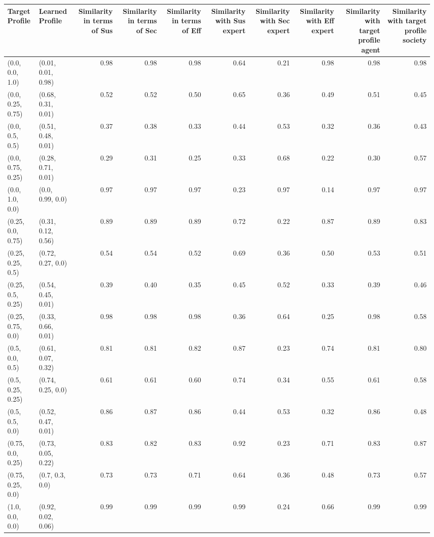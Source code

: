 \begin{tabular}{llrrrrrrrr}
\toprule
Target Profile & Learned Profile & Similarity in terms of Sus & Similarity in terms of Sec & Similarity in terms of Eff & Similarity with Sus expert & Similarity with Sec expert & Similarity with Eff expert & Similarity with target profile agent & Similarity with target profile society \\
\midrule
(0.0, 0.0, 1.0) & (0.01, 0.01, 0.98) & 0.98 & 0.98 & 0.98 & 0.64 & 0.21 & 0.98 & 0.98 & 0.98 \\
(0.0, 0.25, 0.75) & (0.68, 0.31, 0.01) & 0.52 & 0.52 & 0.50 & 0.65 & 0.36 & 0.49 & 0.51 & 0.45 \\
(0.0, 0.5, 0.5) & (0.51, 0.48, 0.01) & 0.37 & 0.38 & 0.33 & 0.44 & 0.53 & 0.32 & 0.36 & 0.43 \\
(0.0, 0.75, 0.25) & (0.28, 0.71, 0.01) & 0.29 & 0.31 & 0.25 & 0.33 & 0.68 & 0.22 & 0.30 & 0.57 \\
(0.0, 1.0, 0.0) & (0.0, 0.99, 0.0) & 0.97 & 0.97 & 0.97 & 0.23 & 0.97 & 0.14 & 0.97 & 0.97 \\
(0.25, 0.0, 0.75) & (0.31, 0.12, 0.56) & 0.89 & 0.89 & 0.89 & 0.72 & 0.22 & 0.87 & 0.89 & 0.83 \\
(0.25, 0.25, 0.5) & (0.72, 0.27, 0.0) & 0.54 & 0.54 & 0.52 & 0.69 & 0.36 & 0.50 & 0.53 & 0.51 \\
(0.25, 0.5, 0.25) & (0.54, 0.45, 0.01) & 0.39 & 0.40 & 0.35 & 0.45 & 0.52 & 0.33 & 0.39 & 0.46 \\
(0.25, 0.75, 0.0) & (0.33, 0.66, 0.01) & 0.98 & 0.98 & 0.98 & 0.36 & 0.64 & 0.25 & 0.98 & 0.58 \\
(0.5, 0.0, 0.5) & (0.61, 0.07, 0.32) & 0.81 & 0.81 & 0.82 & 0.87 & 0.23 & 0.74 & 0.81 & 0.80 \\
(0.5, 0.25, 0.25) & (0.74, 0.25, 0.0) & 0.61 & 0.61 & 0.60 & 0.74 & 0.34 & 0.55 & 0.61 & 0.58 \\
(0.5, 0.5, 0.0) & (0.52, 0.47, 0.01) & 0.86 & 0.87 & 0.86 & 0.44 & 0.53 & 0.32 & 0.86 & 0.48 \\
(0.75, 0.0, 0.25) & (0.73, 0.05, 0.22) & 0.83 & 0.82 & 0.83 & 0.92 & 0.23 & 0.71 & 0.83 & 0.87 \\
(0.75, 0.25, 0.0) & (0.7, 0.3, 0.0) & 0.73 & 0.73 & 0.71 & 0.64 & 0.36 & 0.48 & 0.73 & 0.57 \\
(1.0, 0.0, 0.0) & (0.92, 0.02, 0.06) & 0.99 & 0.99 & 0.99 & 0.99 & 0.24 & 0.66 & 0.99 & 0.99 \\
\bottomrule
\end{tabular}
